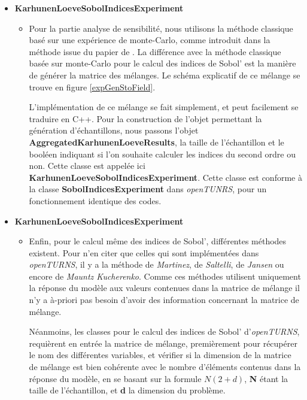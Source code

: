 \documentclass[a4paper,10pt]{article}
\begin{document}
\begin{itemize}
  \item \textbf{KarhunenLoeveSobolIndicesExperiment}
  \begin{itemize}
    \item Pour la partie analyse de sensibilité, nous utilisons la méthode classique basé sur une expérience de monte-Carlo, comme introduit dans la méthode issue du papier de \cite{Wei2017May}. La différence avec la méthode classique basée sur monte-Carlo pour le calcul des indices de Sobol' est la manière de générer la matrice des mélanges. Le schéma explicatif de ce mélange se trouve en figure \ref{expGenStoField}. \par \smallskip
     L’implémentation de ce mélange se fait simplement, et peut facilement se traduire en C++. Pour la construction de l'objet permettant la génération d'échantillons, nous passons l'objet \textbf{AggregatedKarhunenLoeveResults}, la taille de l'échantillon et le booléen indiquant si l'on souhaite calculer les indices du second ordre ou non. Cette classe est appelée ici \textbf{KarhunenLoeveSobolIndicesExperiment}. Cette classe est conforme à la classe \textbf{SobolIndicesExperiment} dans \textit{openTUNRS}, pour un fonctionnement identique des codes. 
  \end{itemize}
  
  
  \item \textbf{KarhunenLoeveSobolIndicesExperiment}
  \begin{itemize}  
    \item Enfin, pour le calcul même des indices de Sobol', différentes méthodes existent. Pour n'en citer que celles qui sont implémentées dans \textit{openTURNS}, il y a la méthode de \textit{Martinez}, de \textit{Saltelli}, de \textit{Jansen} ou encore de \textit{Mauntz Kucherenko}. Comme ces méthodes utilisent uniquement la réponse du modèle aux valeurs contenues dans la matrice de mélange il n'y a à-priori pas besoin d'avoir des information concernant la matrice de mélange. \par \smallskip

    Néanmoins, les classes pour le calcul des indices de Sobol' d'\textit{openTURNS}, requièrent en entrée la matrice de mélange, premièrement pour récupérer le nom des différentes variables, et vérifier si la dimension de la matrice de mélange est bien cohérente avec le nombre d’éléments contenus dans la réponse du modèle, en se basant sur la formule $ N(2+d) $, \textbf{N} étant la taille de l'échantillon, et \textbf{d} la dimension du problème. \par \smallskip
    

\end{itemize}
\end{itemize}
\end{document}

